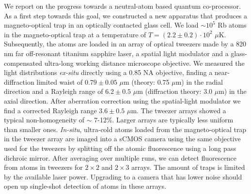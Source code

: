 \noindent We report on the progress towards a neutral-atom based quantum co-processor.
As a first step towards this goal, we constructed a new apparatus that produces a magneto-optical trap in an optically contacted glass cell. 
We load $\sim 10^5$ Rb atoms in the magneto-optical trap at a temperature of $T=(2.2\pm0.2) \cdot 10^2$ $\mu$K.
Subsequently, the atoms are loaded in an array of optical tweezers made by a 820 nm far off-resonant titanium sapphire laser, a spatial light modulator and a glass-compensated ultra-long working distance microscope objective.
We measured the light distributions \textit{ex-situ} directly using a 0.85 NA objective, finding a near-diffraction limited waist of $0.79\pm0.05$ $\mu$m (theory: 0.75 $\mu$m) in the radial direction and a Rayleigh range of $6.2 \pm 0.5$ $\mu$m (diffraction theory: 3.0 $\mu$m) in the axial direction.
After aberration correction using the spatial-light modulator we find a corrected Rayleigh range $3.6\pm0.5$ $\mu$m.
The tweezer arrays showed a typical non-homogeneity of $\sim$ 7-12\%.
Larger arrays are typically less uniform than smaller ones. 
\textit{In-situ}, ultra-cold atoms loaded from the magneto-optical trap in the tweezer array are imaged into a sCMOS camera using the same objective used for the tweezers by splitting off the atomic fluorescence using a long pass dichroic mirror.
After averaging over multiple runs, we can detect fluorescence from atoms in tweezers for $2\times2$ and $2\times3$ arrays.
The amount of traps is limited by the available laser power. 
Upgrading to a camera that has lower noise should open up single-shot detection of atoms in these arrays. 
